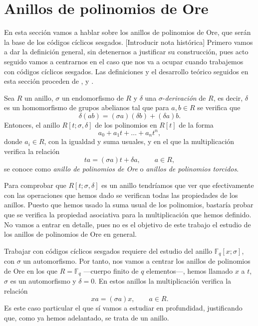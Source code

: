 \chapter{Anillos de polinomios de Ore}

En esta sección vamos a hablar sobre los anillos de polinomios de Ore, que serán la base de los códigos cíclicos sesgados.
[Introducir nota histórica]
Primero vamos a dar la definición general, sin detenernos a justificar su construcción, pues acto seguido vamos a centrarnos en el caso que nos va a ocupar cuando trabajemos con códigos cíclicos sesgados.
Las definiciones y el desarrollo teórico seguidos en esta sección proceden de \parencite{jacobson_finite-dimensional_1996}, \parencite{ore_theory_1933} y \parencite{gomez-torrecillas_factoring_2020}.

\begin{definition}
  Sea \(R\) un anillo, \(\sigma\) un endomorfismo de \(R\) y \(\delta\) una \(\sigma\)-\textit{derivación} de \(R\), es decir, \(\delta\) es un homomorfismo de grupos abelianos tal que para \(a, b \in R\) se verifica que
  \[
    \delta(ab) = (\sigma a)(\delta b) + (\delta a)b.
  \]
  Entonces, el anillo \(R[t; \sigma, \delta]\) de los polinomios en \(R[t]\) de la forma
  \[
    a_0 + a_1t + \dots + a_nt^n,
  \]
  donde \(a_i \in R\), con la igualdad y suma usuales, y en el que la multiplicación verifica la relación 
  \[
  ta = (\sigma a)t + \delta a, \qquad a \in R,
  \]
  se conoce como \textit{anillo de polinomios de Ore} o \textit{anillos de polinomios torcidos}.
\end{definition}

Para comprobar que \(R[t; \sigma, \delta]\) es un anillo tendríamos que ver que efectivamente con las operaciones que hemos dado se verifican todas las propiedades de los anillos.
Puesto que hemos usado la suma usual de los polinomios, bastaría probar que se verifica la propiedad asociativa para la multiplicación que hemos definido.
No vamos a entrar en detalle, pues no es el objetivo de este trabajo el estudio de los anillos de polinomios de Ore en general.

Trabajar con códigos cíclicos sesgados requiere del estudio del anillo \(\mathbb F_q[x; \sigma]\), con \(\sigma\) un automorfismo.
Por tanto, nos vamos a centrar los anillos de polinomios de Ore en los que \(R = \mathbb F_q\) —cuerpo finito de \(q\) elementos—, hemos llamado \(x\) a \(t\), \(\sigma\) es un automorfismo y \(\delta = 0\).
En estos anillos la multiplicación verifica la relación 
\[
  xa = (\sigma a)x, \qquad a \in R.
\]
Es este caso particular el que sí vamos a estudiar en profundidad, justificando que, como ya hemos adelantado, se trata de un anillo.

